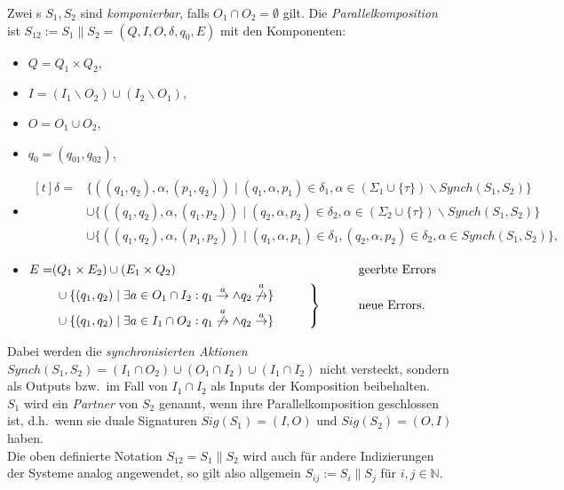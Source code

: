 \begin{Def}[Parallelkomposition]
\label{DefParallelkomposition}
  Zwei \EIO{}s $S_1, S_2$ sind \emph{komponierbar}, falls
  $O_1\cap O_2=\emptyset$ gilt. Die \emph{Parallelkomposition} ist
  $S_{12}:=S_1\|S_2=(Q,I,O,\delta ,q_0,E)$ mit den Komponenten:
  \begin{itemize}
    \item $Q=Q_1\times Q_2$,
    \item $I=(I_1\backslash O_2)\cup(I_2\backslash O_1)$,
    \item $O=O_1\cup O_2$,
    \item $q_0=(q_{01},q_{02})$,
    \item $\begin{aligned}[t]
    \delta =&\{((q_1,q_2),\alpha ,(p_1,q_2))\mid (q_1,\alpha ,p_1)\in\delta
      _1,\alpha\in(\Sigma _1\cup\{\tau\})\backslash Synch(S_1,S_2)\}\\
      &\cup\{((q_1,q_2),\alpha ,(q_1,p_2))\mid (q_2,\alpha ,p_2)\in\delta
      _2,\alpha\in(\Sigma _2\cup\{\tau\})\backslash Synch(S_1,S_2)\}\\
      &\cup\{((q_1,q_2),\alpha ,(p_1,p_2))\mid (q_1,\alpha ,p_1)\in\delta
      _1, (q_2,\alpha ,p_2)\in\delta _2, \alpha\in Synch(S_1,S_2)\},
  \end{aligned}$
    \item $\begin{aligned}[t]
        E=&(Q_1\times E_2)\cup (E_1\times Q_2)
        &&\phantom{neue}\mathrm{geerbte}~\mathrm{Errors}\\
        &\left.\begin{aligned}
        &\cup\{(q_1,q_2)\mid \exists a\in O_1\cap I_2: q_1\overset{a}{\rightarrow}\wedge
      q_2\overset{a}{\not{\hspace{-0.1cm}\rightarrow}}\}\\
      &\cup\{(q_1,q_2)\mid \exists a\in I_1\cap O_2:
q_1\overset{a}{\not{\hspace{-0.1cm}\rightarrow}}\wedge
q_2\overset{a}{\rightarrow}\}
\end{aligned}\hspace{1cm}\right\}
      &&\phantom{neue}\mathrm{neue}~\mathrm{Errors}.\\
  \end{aligned}$
  \end{itemize}
  Dabei werden die \emph{synchronisierten Aktionen} $Synch(S_1,
  S_2)=(I_1\cap O_2)\cup(O_1\cap I_2)\cup (I_1\cap I_2)$ nicht versteckt,
  sondern als Outputs bzw.\ im Fall von $I_1\cap I_2$ als Inputs der
  Komposition beibehalten.\\
  $S_1$ wird ein \emph{Partner} von $S_2$ genannt, wenn ihre
  Parallelkomposition geschlossen ist, d.h.\ wenn sie duale Signaturen
  $Sig(S_1)=(I,O)$ und $Sig(S_2)=(O,I)$ haben.\\
  Die oben definierte Notation $S_{12}=S_1\|S_2$ wird auch für andere
  Indizierungen der Systeme analog angewendet, so gilt also allgemein
  $S_{ij}:=S_i\|S_j$ für $i,j\in\mathbb{N}$.
\end{Def}

